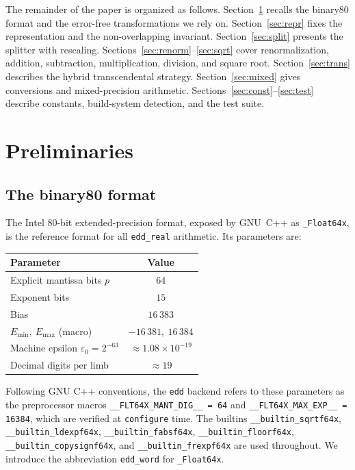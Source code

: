 \documentclass[11pt,a4paper]{article}
\begin{document}
The remainder of the paper is organized as follows.
Section~\ref{sec:prelim} recalls the binary80 format and the
error-free transformations we rely on.
Section~\ref{sec:repr} fixes the representation and the
non-overlapping invariant.
Section~\ref{sec:split} presents the splitter with rescaling.
Sections~\ref{sec:renorm}--\ref{sec:sqrt} cover renormalization,
addition, subtraction, multiplication, division, and square
root.  Section~\ref{sec:trans} describes the hybrid transcendental
strategy.  Section~\ref{sec:mixed} gives conversions and
mixed-precision arithmetic.
Sections~\ref{sec:const}--\ref{sec:test} describe constants,
build-system detection, and the test suite.

\section{Preliminaries}
\label{sec:prelim}

\subsection{The binary80 format}

The Intel 80-bit extended-precision format, exposed by GNU~C++
as \texttt{\_Float64x}, is the reference format for all
\texttt{edd\_real} arithmetic.  Its parameters are:

\begin{center}
\begin{tabular}{lc}
\toprule
Parameter & Value \\
\midrule
Explicit mantissa bits $p$ & $64$ \\
Exponent bits & $15$ \\
Bias & $16\,383$ \\
$E_{\min},\ E_{\max}$ (macro) & $-16\,381,\ 16\,384$ \\
Machine epsilon $\varepsilon_0 = 2^{-63}$ & $\approx 1.08\times 10^{-19}$ \\
Decimal digits per limb & $\approx 19$ \\
\bottomrule
\end{tabular}
\end{center}

Following GNU C++ conventions, the \texttt{edd} backend refers to
these parameters as the preprocessor macros
\texttt{\_\_FLT64X\_MANT\_DIG\_\_ = 64} and
\texttt{\_\_FLT64X\_MAX\_EXP\_\_ = 16384}, which are verified at
\texttt{configure} time.  The builtins
\verb|__builtin_sqrtf64x|, \verb|__builtin_ldexpf64x|,
\verb|__builtin_fabsf64x|, \verb|__builtin_floorf64x|,
\verb|__builtin_copysignf64x|, and \verb|__builtin_frexpf64x|
are used throughout.  We introduce the abbreviation
\verb|edd_word| for \texttt{\_Float64x}.
\end{document}
